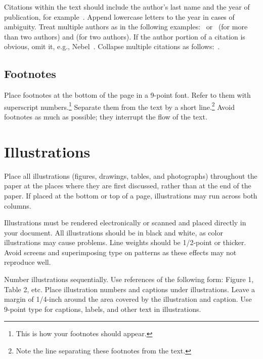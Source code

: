 \documentclass{article}
\numberwithin{equation}{section}
\begin{document}
Citations within the text should include the author's last name and
the year of publication, for example~\cite{gottlob:nonmon}.  Append
lowercase letters to the year in cases of ambiguity.  Treat multiple
authors as in the following examples:~\cite{abelson-et-al:scheme}
or~\cite{bgf:Lixto} (for more than two authors) and
\cite{brachman-schmolze:kl-one} (for two authors).  If the author
portion of a citation is obvious, omit it, e.g.,
Nebel~.  Collapse multiple citations as
follows:~\cite{gls:hypertrees,levesque:functional-foundations}.
\nocite{abelson-et-al:scheme}
\nocite{bgf:Lixto}
\nocite{brachman-schmolze:kl-one}
\nocite{gottlob:nonmon}
\nocite{gls:hypertrees}
\nocite{levesque:functional-foundations}
\nocite{levesque:belief}
\nocite{nebel:jair-2000}

\subsection{Footnotes}

Place footnotes at the bottom of the page in a 9-point font.  Refer to
them with superscript numbers.\footnote{This is how your footnotes
should appear.} Separate them from the text by a short
line.\footnote{Note the line separating these footnotes from the
text.} Avoid footnotes as much as possible; they interrupt the flow of
the text.

\section{Illustrations}

Place all illustrations (figures, drawings, tables, and photographs)
throughout the paper at the places where they are first discussed,
rather than at the end of the paper. If placed at the bottom or top of
a page, illustrations may run across both columns.

Illustrations must be rendered electronically or scanned and placed
directly in your document. All illustrations should be in black and
white, as color illustrations may cause problems. Line weights should
be 1/2-point or thicker. Avoid screens and superimposing type on
patterns as these effects may not reproduce well.

Number illustrations sequentially. Use references of the following
form: Figure 1, Table 2, etc. Place illustration numbers and captions
under illustrations. Leave a margin of 1/4-inch around the area
covered by the illustration and caption.  Use 9-point type for
captions, labels, and other text in illustrations.
\end{document}
